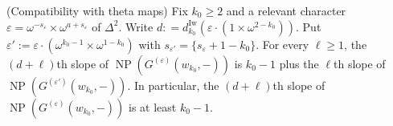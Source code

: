 \begin{proposition}
    \label{P:ghost_compatible_with_theta_AL_and_p-stabilization_part1}
    (Compatibility with theta maps)
    Fix $k_0 \geq 2$ and a relevant character $\varepsilon= \omega^{-s_\varepsilon} \times \omega^{a+s_\varepsilon}$ of $\Delta^2$. Write $d: = d_{k_0}^{\mathrm{Iw}}(\varepsilon\cdot (1\times \omega^{2-k_0}))$.
    Put $\varepsilon' := \varepsilon \cdot (\omega^{k_0-1} \times \omega^{1-k_0})$ with $s_{\varepsilon'} = \{s_\varepsilon +1-k_0\}$. For every $\ell\geq 1$, the $(d+\ell)$th slope of ${\operatorname{NP}}(G^{(\varepsilon)}(w_{k_0}, -))$ is $k_0-1$ plus the  $\ell$th slope of ${\operatorname{NP}}(G^{(\varepsilon')}(w_{k_0}, -))$.
    In particular, the $(d+\ell)$th slope of ${\operatorname{NP}}(G^{(\varepsilon)}(w_{k_0}, -))$ is at least ${k_0}-1$.
\end{proposition}

